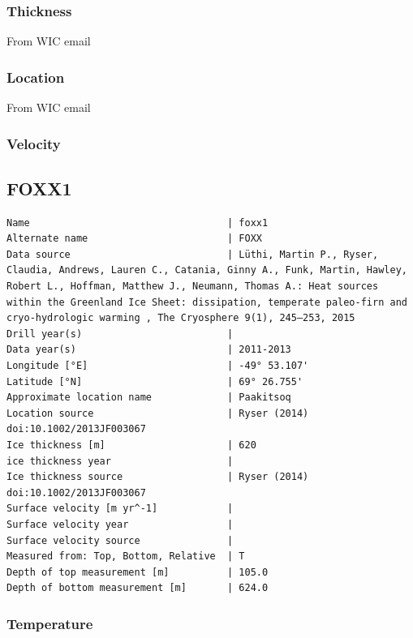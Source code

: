 \documentclass[article,a4paper,times,11pt,twoside]{article}
\begin{document}
\subsubsection{Thickness}
\label{sec:org710dd2e}

From WIC email

\subsubsection{Location}
\label{sec:orgc669546}

From WIC email

\subsubsection{Velocity}
\label{sec:orgf5cfd46}
\clearpage
\subsection{FOXX1}
\label{sec:orgc717d4d}
\begin{verbatim}
Name                                  | foxx1
Alternate name                        | FOXX
Data source                           | Lüthi, Martin P., Ryser, Claudia, Andrews, Lauren C., Catania, Ginny A., Funk, Martin, Hawley, Robert L., Hoffman, Matthew J., Neumann, Thomas A.: Heat sources within the Greenland Ice Sheet: dissipation, temperate paleo-firn and cryo-hydrologic warming , The Cryosphere 9(1), 245–253, 2015 
Drill year(s)                         | 
Data year(s)                          | 2011-2013
Longitude [°E]                        | -49° 53.107'
Latitude [°N]                         | 69° 26.755'
Approximate location name             | Paakitsoq
Location source                       | Ryser (2014) doi:10.1002/2013JF003067
Ice thickness [m]                     | 620
ice thickness year                    | 
Ice thickness source                  | Ryser (2014) doi:10.1002/2013JF003067
Surface velocity [m yr^-1]            | 
Surface velocity year                 | 
Surface velocity source               | 
Measured from: Top, Bottom, Relative  | T
Depth of top measurement [m]          | 105.0
Depth of bottom measurement [m]       | 624.0
\end{verbatim}

\subsubsection{Temperature}
\label{sec:org8a88e55}
\end{document}
